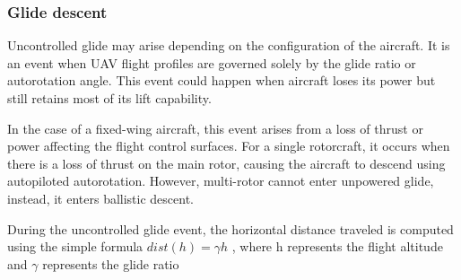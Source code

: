 \documentclass[12pt]{report}
\begin{document}
        \subsubsection{Glide descent}
        Uncontrolled glide may arise depending on the configuration of the aircraft. It is an event when UAV flight
        profiles are governed solely by the glide ratio or autorotation angle. This event could happen when aircraft
        loses its power but still retains most of its lift capability.
            
        In the case of a fixed-wing aircraft, this event arises from a loss of thrust or power affecting the flight
        control surfaces. For a single rotorcraft, it occurs when there is a loss of thrust on the main rotor, causing
        the aircraft to descend using autopiloted autorotation. However, multi-rotor cannot enter unpowered glide,
        instead, it enters ballistic descent.
            
        During the uncontrolled glide event, the horizontal distance traveled is computed using the simple formula
        \(dist(h) = \gamma{h}\) , where h represents the flight altitude and \(\gamma\) represents the glide ratio
\end{document}
